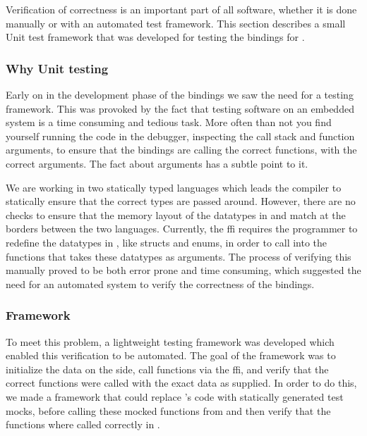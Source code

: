 Verification of correctness is an important part of all software, whether it is done manually or with an automated test framework.
This section describes a small Unit test framework that was developed for testing the bindings for {\emlib}.

\subsubsection{Why Unit testing}

Early on in the development phase of the {\emlib} bindings we saw the need for a testing framework.
This was provoked by the fact that testing software on an embedded system is a time consuming and tedious task.
More often than not you find yourself running the code in the debugger, inspecting the call stack and function arguments, to ensure that the bindings are calling the correct functions, with the correct arguments.
The fact about arguments has a subtle point to it.

We are working in two statically typed languages which leads the compiler to statically ensure that the correct types are passed around.
However, there are no checks to ensure that the memory layout of the datatypes in {\C} and {\rust} match at the borders between the two languages.
Currently, the {\rust} \gls{ffi} requires the programmer to redefine the {\C} datatypes in {\rust}, like structs and enums, in order to call into the {\C} functions that takes these datatypes as arguments.
The process of verifying this manually proved to be both error prone and time consuming, which suggested the need for an automated system to verify the correctness of the bindings.

\subsubsection{Framework}

To meet this problem, a lightweight testing framework was developed which enabled this verification to be automated.
The goal of the framework was to initialize the data on the {\rust} side, call functions via the \gls{ffi}, and verify that the correct functions were called with the exact data as supplied.
In order to do this, we made a framework that could replace {\emlib}'s code with statically generated test mocks, before calling these mocked functions from {\rust} and then verify that the functions where called correctly in {\C}.

